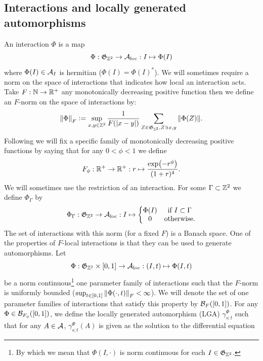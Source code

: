 \documentclass[12pt,a4paper,twoside]{article}
\numberwithin{equation}{section}
\begin{document}
\subsection{Interactions and locally generated automorphisms}\label{sec:Interactions}
An interaction $\Phi$ is a map
\begin{equation}
	\Phi: \mathfrak{G}_{\ZZ^2}\rightarrow \AA_{\text{loc}}: I \mapsto \Phi(I)
\end{equation}
where $\Phi(I)\in\AA_I$ is hermitian ($\Phi(I)=\Phi(I)^*$). We will sometimes require a norm on the space of interactions that indicates how local an interaction acts. Take $F:\NN\rightarrow \RR^+$ any monotonically decreasing positive function then we define an $F$-norm on the space of interactions by:
\begin{equation}
	\norm{\Phi}_F\defeq \sup_{x,y\in\ZZ^2}\frac{1}{F(\abs{x-y})}\sum_{Z\in\mathfrak{G}_{\ZZ^2},Z\ni x,y}\norm{\Phi(Z)}.
\end{equation}
Following \cite{ogata2021h3gmathbb} we will fix a specific family of monotonically decreasing positive functions by saying that for any $0<\phi<1$ we define
\begin{equation}\label{eq:OurFFunction}
	F_\phi:\RR^+\rightarrow\RR^+:r\mapsto \frac{\exp(-r^\phi)}{(1+r)^4}.
\end{equation}
We will sometimes use the restriction of an interaction. For some $\Gamma\subset\ZZ^2$ we define $\Phi_\Gamma$ by
\begin{equation}
	\Phi_\Gamma:\mathfrak{G}_{\ZZ^2}\rightarrow \AA_{\text{loc}}:I\mapsto\left\{\begin{matrix}
		\Phi(I)&\text{if }I\subset\Gamma\\0&\text{otherwise}.
	\end{matrix}\right.
\end{equation}
The set of interactions with this norm (for a fixed $F$) is a Banach space. One of the properties of $F$-local interactions is that they can be used to generate automorphisms. Let
\begin{equation}
	\Phi:\mathfrak{G}_{\ZZ^2}\times [0,1]\rightarrow \AA_{\text{loc}}:(I,t)\mapsto \Phi(I,t)
\end{equation}
be a norm continuous\footnote{By which we mean that $\Phi(I,\cdot)$ is norm continuous for each $I\in\mathfrak{G}_{\ZZ^2}$.} one parameter family of interactions such that the $F$-norm is uniformly bounded ($\sup_{t\in[0,1]}\norm{\Phi(\cdot,t)}_F<\infty$). We will denote the set of one parameter families of interactions that satisfy this property by $\BB_{F}([0,1])$. For any $\Phi\in\BB_{F_\phi}([0,1])$, we define the locally generated automorphism (LGA) $\gamma^{\Phi}_{s;t}$ such that for any $A\in\AA$, $\gamma^{\Phi}_{s;t}(A)$ is given as the solution to the differential equation
\end{document}
